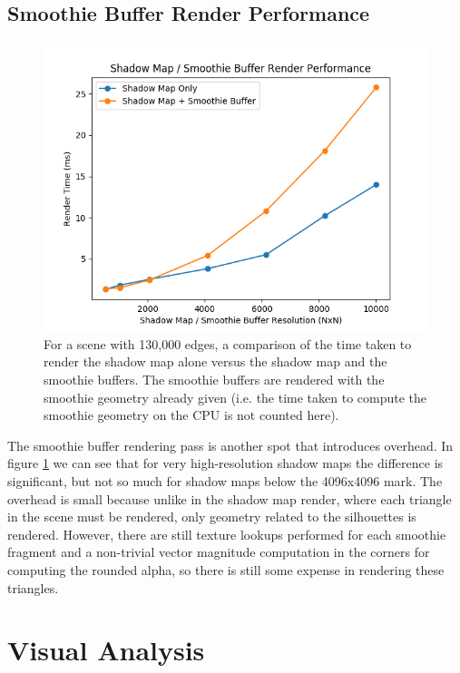 \documentclass[sigconf]{acmart}
\begin{document}
\subsection{Smoothie Buffer Render Performance}

\begin{figure}[t]
    \includegraphics[width=\linewidth]{reportfiles/sm-smoothie-buffer-render-performance}
    \caption{For a scene with 130,000 edges, a comparison of the time taken to render the shadow map alone versus the shadow map and the smoothie buffers. The smoothie buffers are rendered with the smoothie geometry already given (i.e. the time taken to compute the smoothie geometry on the CPU is not counted here).}
    \label{fig:sm-smoothie-buffer-render-performance}
\end{figure}

The smoothie buffer rendering pass is another spot that introduces overhead. In figure \ref{fig:sm-smoothie-buffer-render-performance} we can see that for very high-resolution shadow maps the difference is significant, but not so much for shadow maps below the 4096x4096 mark. The overhead is small because unlike in the shadow map render, where each triangle in the scene must be rendered, only geometry related to the silhouettes is rendered. However, there are still texture lookups performed for each smoothie fragment and a non-trivial vector magnitude computation in the corners for computing the rounded alpha, so there is still some expense in rendering these triangles.

\section{Visual Analysis}
\end{document}
